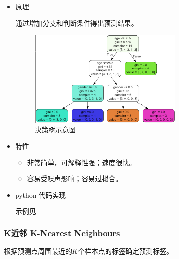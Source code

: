 \documentclass{article}
\begin{document}
\begin{itemize}

\item{原理}

通过增加分支和判断条件得出预测结果。

\begin{figure}[H]
    \centering
    \includegraphics[width = 3in]{decision_tree}
    \caption{决策树示意图}
    \label{fig:decision_tree}
\end{figure}

\item{特性}

\begin{itemize}
    \item 非常简单，可解释性强；速度很快。
    \item 容易受噪声影响；容易过拟合。
\end{itemize}

\item{python 代码实现}

示例见

\end{itemize}

\subsubsection{K近邻 K-Nearest Neighbours}

根据预测点周围最近的$K$个样本点的标签确定预测标签。
\end{document}
